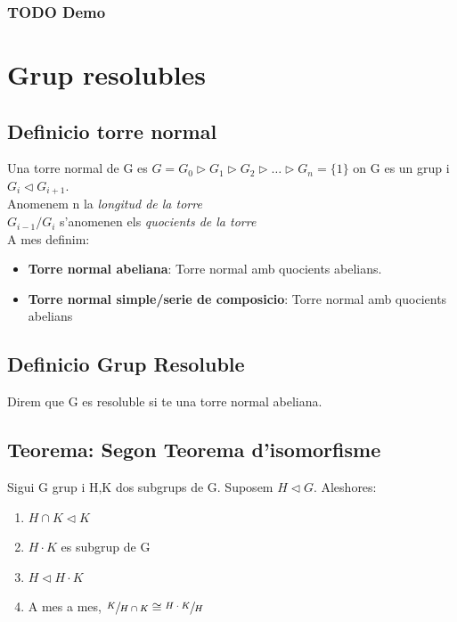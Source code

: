 \documentclass[11pt]{article}
\begin{document}
\subsubsection{{\bfseries\sffamily TODO} Demo}
\label{sec:orgf6983d9}

\section{Grup resolubles}
\label{sec:org8c544cf}

\subsection{Definicio torre normal}
\label{sec:orgdb17b2c}
Una torre normal de G es \(G = G_0 \vartriangleright G_1 \vartriangleright G_2 \vartriangleright \ldots \vartriangleright G_n = \{1\}\) on G es un grup i \(G_i \vartriangleleft G_{i+1}\). \\
Anomenem n la \emph{longitud de la torre} \\
\(G_{i-1}/G_i\) s'anomenen els \emph{quocients de la torre} \\

A mes definim:
\begin{itemize}
\item \textbf{Torre normal abeliana}: Torre normal amb quocients abelians.
\item \textbf{Torre normal simple/serie de composicio}: Torre normal amb quocients abelians
\end{itemize}

\subsection{Definicio Grup Resoluble}
\label{sec:org553b19d}
Direm que G es resoluble si te una torre normal abeliana.

\subsection{Teorema: Segon Teorema d'isomorfisme}
\label{sec:org81ca656}
Sigui G grup i H,K dos subgrups de G. Suposem \(H \vartriangleleft G\). Aleshores:
\begin{enumerate}
\item \(H \cap K \vartriangleleft K\)
\item \(H \cdot K\) es subgrup de G
\item \(H \vartriangleleft H \cdot K\)
\item A mes a mes, \(\sfrac{K}{H \cap K} \cong \sfrac{H \cdot K}{H}\)
\end{enumerate}
\end{document}
